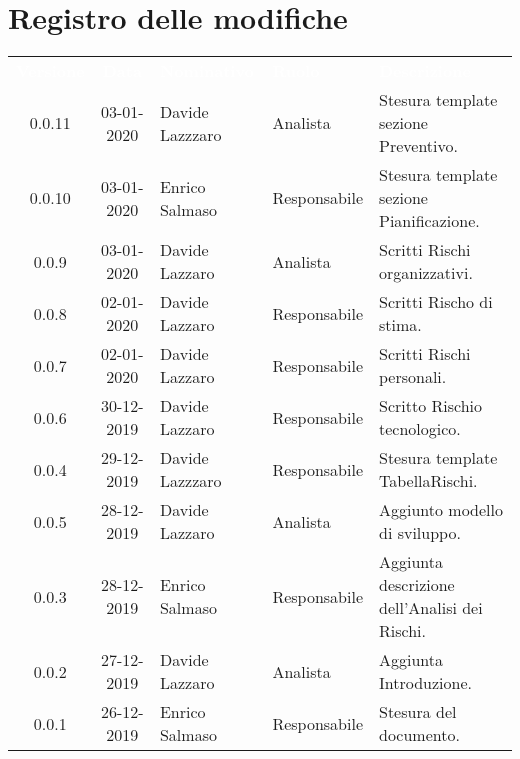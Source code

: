 \section*{Registro delle modifiche}
{
\renewcommand{\arraystretch}{1.5}
\centering
\begin{longtable}{ c c  C{4cm}  C{3cm} C{4cm}}
\textcolor{white}{\textbf{Versione}} & \textcolor{white}{\textbf{Data}} & \textcolor{white}{\textbf{Nominativo}} & \textcolor{white}{\textbf{Ruolo}} & \textcolor{white}{\textbf{Descrizione}}\\	

0.0.11 & 03-01-2020 & Davide Lazzzaro & Analista & Stesura template sezione Preventivo.\\
0.0.10 & 03-01-2020 & Enrico Salmaso & Responsabile & Stesura template sezione Pianificazione.\\
0.0.9 & 03-01-2020 & Davide Lazzaro & Analista & Scritti Rischi organizzativi. \\
0.0.8 & 02-01-2020 & Davide Lazzaro & Responsabile & Scritti Rischo di stima. \\
0.0.7 & 02-01-2020 & Davide Lazzaro & Responsabile & Scritti Rischi personali. \\
0.0.6 & 30-12-2019 & Davide Lazzaro & Responsabile & Scritto Rischio tecnologico. \\
0.0.4 & 29-12-2019 & Davide Lazzzaro & Responsabile & Stesura template TabellaRischi.\\
0.0.5 & 28-12-2019 & Davide Lazzaro & Analista & Aggiunto modello di sviluppo.\\
0.0.3 & 28-12-2019 & Enrico Salmaso & Responsabile & Aggiunta descrizione dell'Analisi dei Rischi. \\
0.0.2 & 27-12-2019 & Davide Lazzaro & Analista & Aggiunta Introduzione. \\
0.0.1 & 26-12-2019 & Enrico Salmaso & Responsabile & Stesura del documento.  \\
		
\end{longtable}
}